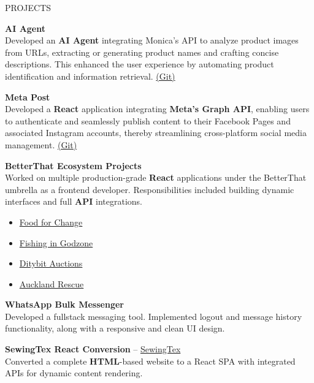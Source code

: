 \documentclass{resume} %
\begin{document}
\begin{rSection}{PROJECTS}
\vspace{-1.25em}
\item \textbf{AI Agent} \\
Developed an \textbf{AI Agent} integrating Monica's API to analyze product images from URLs, extracting or generating product names and crafting concise descriptions. This enhanced the user experience by automating product identification and information retrieval.
\href{https://github.com/rafidrahman1/ai_agent}{(Git)}

\item \textbf{Meta Post} \\
Developed a \textbf{React} application integrating \textbf{Meta's Graph API}, enabling users to authenticate and seamlessly publish content to their Facebook Pages and associated Instagram accounts, thereby streamlining cross-platform social media management.
\href{https://github.com/rafidrahman1/meta_post}{(Git)}

\item \textbf{BetterThat Ecosystem Projects} \\
Worked on multiple production-grade \textbf{React} applications under the BetterThat umbrella as a frontend developer. Responsibilities included building dynamic interfaces and full \textbf{API} integrations.
\begin{itemize}
    \item \href{https://ffc.betterthatconnect.com/}{Food for Change}
    \item \href{https://fig.betterthatconnect.com/}{Fishing in Godzone}
    \item \href{https://ditybit.com/}{Ditybit Auctions}
    \item \href{https://ar.betterthatconnect.com/}{Auckland Rescue}
\end{itemize}

\item \textbf{WhatsApp Bulk Messenger} \\
Developed a fullstack messaging tool. Implemented logout and message history functionality, along with a responsive and clean UI design.

\item \textbf{SewingTex React Conversion} – \href{https://sewingtexapparels.com/}{SewingTex} \\
Converted a complete \textbf{HTML}-based website to a React SPA with integrated APIs for dynamic content rendering.


\end{rSection}
\end{document}
